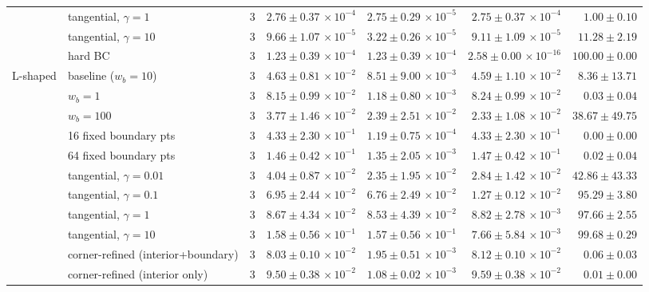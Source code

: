 \begin{tabular}{llrrrrr}
 & tangential, $\gamma{=}1$ & 3 & $2.76\pm0.37\,\times\!10^{-4}$ & $2.75\pm0.29\,\times\!10^{-5}$ & $2.75\pm0.37\,\times\!10^{-4}$ & $1.00\pm0.10$ \\
 & tangential, $\gamma{=}10$ & 3 & $9.66\pm1.07\,\times\!10^{-5}$ & $3.22\pm0.26\,\times\!10^{-5}$ & $9.11\pm1.09\,\times\!10^{-5}$ & $11.28\pm2.19$ \\
 & hard BC & 3 & $1.23\pm0.39\,\times\!10^{-4}$ & $1.23\pm0.39\,\times\!10^{-4}$ & $2.58\pm0.00\,\times\!10^{-16}$ & $100.00\pm0.00$ \\
\midrule
L-shaped & baseline ($w_b{=}10$) & 3 & $4.63\pm0.81\,\times\!10^{-2}$ & $8.51\pm9.00\,\times\!10^{-3}$ & $4.59\pm1.10\,\times\!10^{-2}$ & $8.36\pm13.71$ \\
 & $w_b{=}1$ & 3 & $8.15\pm0.99\,\times\!10^{-2}$ & $1.18\pm0.80\,\times\!10^{-3}$ & $8.24\pm0.99\,\times\!10^{-2}$ & $0.03\pm0.04$ \\
 & $w_b{=}100$ & 3 & $3.77\pm1.46\,\times\!10^{-2}$ & $2.39\pm2.51\,\times\!10^{-2}$ & $2.33\pm1.08\,\times\!10^{-2}$ & $38.67\pm49.75$ \\
 & 16 fixed boundary pts & 3 & $4.33\pm2.30\,\times\!10^{-1}$ & $1.19\pm0.75\,\times\!10^{-4}$ & $4.33\pm2.30\,\times\!10^{-1}$ & $0.00\pm0.00$ \\
 & 64 fixed boundary pts & 3 & $1.46\pm0.42\,\times\!10^{-1}$ & $1.35\pm2.05\,\times\!10^{-3}$ & $1.47\pm0.42\,\times\!10^{-1}$ & $0.02\pm0.04$ \\
 & tangential, $\gamma{=}0.01$ & 3 & $4.04\pm0.87\,\times\!10^{-2}$ & $2.35\pm1.95\,\times\!10^{-2}$ & $2.84\pm1.42\,\times\!10^{-2}$ & $42.86\pm43.33$ \\
 & tangential, $\gamma{=}0.1$ & 3 & $6.95\pm2.44\,\times\!10^{-2}$ & $6.76\pm2.49\,\times\!10^{-2}$ & $1.27\pm0.12\,\times\!10^{-2}$ & $95.29\pm3.80$ \\
 & tangential, $\gamma{=}1$ & 3 & $8.67\pm4.34\,\times\!10^{-2}$ & $8.53\pm4.39\,\times\!10^{-2}$ & $8.82\pm2.78\,\times\!10^{-3}$ & $97.66\pm2.55$ \\
 & tangential, $\gamma{=}10$ & 3 & $1.58\pm0.56\,\times\!10^{-1}$ & $1.57\pm0.56\,\times\!10^{-1}$ & $7.66\pm5.84\,\times\!10^{-3}$ & $99.68\pm0.29$ \\
 & corner-refined (interior+boundary) & 3 & $8.03\pm0.10\,\times\!10^{-2}$ & $1.95\pm0.51\,\times\!10^{-3}$ & $8.12\pm0.10\,\times\!10^{-2}$ & $0.06\pm0.03$ \\
 & corner-refined (interior only) & 3 & $9.50\pm0.38\,\times\!10^{-2}$ & $1.08\pm0.02\,\times\!10^{-3}$ & $9.59\pm0.38\,\times\!10^{-2}$ & $0.01\pm0.00$ \\
\bottomrule
\end{tabular}
